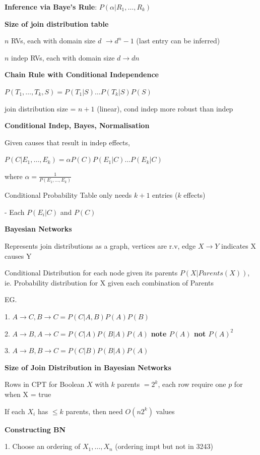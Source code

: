 \documentclass[10pt, a4paper]{article}
\newcommand{\highlight}[1]{{\color{red}\textbf{#1}}}
\newcommand{\red}[1]{{\color{red}#1}}
\begin{document}
\begin{multicols*}{3}
		\textbf{Inference via Baye's Rule}: $P(\alpha | R_1, \dots , R_k)$

		\textbf{Size of join distribution table}

		$n$ RVs, each with domain size $d$ $\rightarrow d^n - 1$ (last entry can be inferred)

		$n$ indep RVs, each with domain size $d \rightarrow dn$

		\textbf{Chain Rule with Conditional Independence}

		$P(T_1, \dots, T_k, S)  = P(T_1|S) \dots P(T_k|S) P(S)$

		join distribution size = $n + 1$ (linear), cond indep more robust than indep

		\textbf{Conditional Indep, Bayes, Normalisation}

		Given causes that result in indep effects,

		$P(C | E_1, \dots, E_k) = \alpha P(C) P(E_1 | C) \dots P(E_k|C)$

		where $\alpha = \frac{1}{P(E_1,\dots , E_k)}$
		
		Conditional Probability Table only needs $k + 1$ entries ($k$ effects)

		- Each $P(E_i | C)$ and $P(C)$

		\textbf{Bayesian Networks}

		Represents join distributions as a graph, \red{vertices} are r.v, \red{edge} $X \rightarrow Y$ indicates X causes Y

		\red{Conditional Distribution} for each node given its parents $P(X | Parents(X))$, ie. Probability distribution for X given \red{each combination of Parents}

		EG.

		1. $A \rightarrow C, B \rightarrow C = P(C|A,B) P(A)P(B)$

		2. $A \rightarrow B, A \rightarrow C = P(C|A)P(B|A)P(A)$ \highlight{note $P(A)$ not $P(A)^2$}

		3. $A \rightarrow B, B \rightarrow C = P(C|B)P(B|A)P(A)$

		\textbf{Size of Join Distribution in Bayesian Networks}

		Rows in CPT for Boolean $X$ with $k$ parents $ = 2^k$, each row require one $p$ for when X = true

		If each $X_i$ has $\leq k$ parents, then need $O(n2^k)$ values

		\textbf{Constructing BN}

		1. Choose an ordering of $X_1, \dots, X_n$ (ordering impt but not in 3243)


\end{multicols*}
\end{document}
